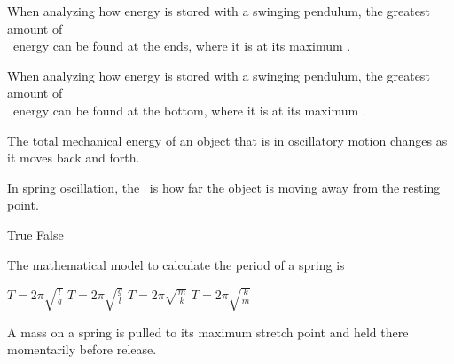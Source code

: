 \documentclass[]{exam}
\begin{document}
\begin{questions}
\question 
When analyzing how energy is stored with a swinging pendulum, the greatest amount of\\ \fillin[][3cm]\ energy can be found at the ends, where it is at its maximum \fillin[][3cm].

\question
When analyzing how energy is stored with a swinging pendulum, the greatest amount of\\ \fillin[][3cm]\ energy can be found at the bottom, where it is at its maximum \fillin[][3cm].

\question
The total mechanical energy of an object that is in oscillatory motion changes as it moves back and forth.

\question
In spring oscillation, the \fillin[][3cm]\ is how far the object is moving away from the resting point. 
\begin{randomizechoices}[norandomize]
    \choice True
    \correctchoice False
\end{randomizechoices}

\question
The mathematical model to calculate the period of a spring is

\begin{randomizechoices}[norandomize]
    \choice $\displaystyle T = 2\pi \sqrt{\frac{l}{g}}$  \vspace{6pt}
    \choice $\displaystyle T = 2\pi \sqrt{\frac{g}{l}}$  \vspace{6pt}
    \correctchoice $\displaystyle T = 2\pi \sqrt{\frac{m}{k}}$  \vspace{6pt}
    \choice $\displaystyle T = 2\pi \sqrt{\frac{k}{m}}$  \vspace{6pt}
\end{randomizechoices}

\question
A mass on a spring is pulled to its maximum stretch point and held there momentarily before release.

\begin{center}
\end{center}


\end{questions}
\end{document}
